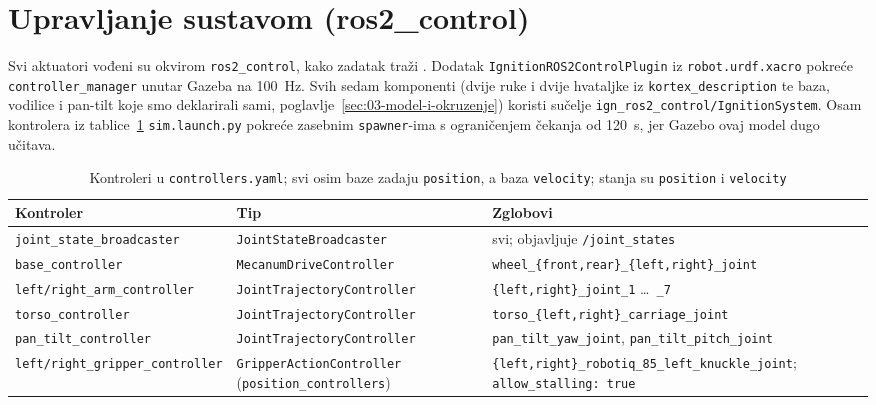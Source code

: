 \section{Upravljanje sustavom (ros2\_control)}
\label{sec:04-upravljanje}

Svi aktuatori vođeni su okvirom \texttt{ros2\_control}, kako zadatak traži \cite{mail2026}.
Dodatak \texttt{IgnitionROS2ControlPlugin} iz \texttt{robot.urdf.xacro} pokreće
\texttt{controller\_manager} unutar Gazeba na 100~Hz. Svih sedam komponenti (dvije ruke i dvije
hvataljke iz \texttt{kortex\_description} \cite{kortex} te baza, vodilice i pan-tilt koje smo
deklarirali sami, poglavlje~\ref{sec:03-model-i-okruzenje}) koristi sučelje
\texttt{ign\_ros2\_control/IgnitionSystem}. Osam kontrolera iz tablice~\ref{tab:kontroleri}
\texttt{sim.launch.py} pokreće zasebnim \texttt{spawner}-ima s ograničenjem čekanja od 120~s,
jer Gazebo ovaj model dugo učitava.

\begin{table}[H]
  \centering
  \scriptsize
  \setlength{\tabcolsep}{4pt}
  \caption{Kontroleri u \texttt{controllers.yaml}; svi osim baze zadaju \texttt{position}, a
    baza \texttt{velocity}; stanja su \texttt{position} i \texttt{velocity}}
  \label{tab:kontroleri}
  \begin{tabularx}{\textwidth}{@{}>{\raggedright\arraybackslash}p{4.1cm}>{\raggedright\arraybackslash}p{3.6cm}>{\raggedright\arraybackslash}X@{}}
    \toprule
    \textbf{Kontroler} & \textbf{Tip} & \textbf{Zglobovi} \\
    \midrule
    \texttt{joint\_state\_broadcaster} & \texttt{JointStateBroadcaster} & svi; objavljuje \texttt{/joint\_states} \\
    \texttt{base\_controller} & \texttt{MecanumDriveController} & \texttt{wheel\_\{front,rear\}\_\{left,right\}\_joint} \\
    \texttt{left/right\_arm\_controller} & \texttt{JointTrajectoryController} & \texttt{\{left,right\}\_joint\_1} \dots\ \texttt{\_7} \\
    \texttt{torso\_controller} & \texttt{JointTrajectoryController} & \texttt{torso\_\{left,right\}\_carriage\_joint} \\
    \texttt{pan\_tilt\_controller} & \texttt{JointTrajectoryController} & \texttt{pan\_tilt\_yaw\_joint}, \texttt{pan\_tilt\_pitch\_joint} \\
    \texttt{left/right\_gripper\_controller} & \texttt{GripperActionController} (\texttt{position\_controllers}) & \texttt{\{left,right\}\_robotiq\_85\_left\_knuckle\_joint}; \texttt{allow\_stalling: true} \\
    \bottomrule
  \end{tabularx}
\end{table}

